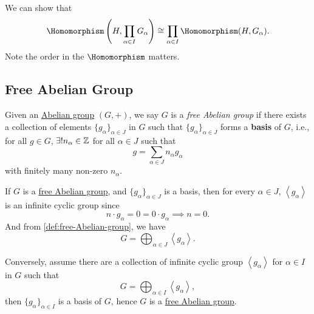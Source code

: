\begin{exercise}
	We can show that
	\[
		\Homomorphism \left(H, \prod\limits_{\alpha \in I}G_\alpha\right) \cong \prod\limits_{\alpha \in I}\Homomorphism (H, G_\alpha).
	\]
	Note the order in the \(\Homomorphism \) matters.
\end{exercise}

\subsection{Free Abelian Group}
\begin{definition}\label{def:free-Abelian-group}
	Given an  \hyperref[def:Abelian-group]{Abelian group} \((G, +)\), we say \(G\) is a \emph{free Abelian group} if there exists a collection of elements \(\{g_\alpha \}_{\alpha \in J}\) in \(G\) such that
	\(\{g_\alpha \}_{\alpha \in J}\) forms a \textbf{basis} of \(G\), i.e., for all \(g\in G\), \(\exists ! n _\alpha \in \mathbb{\MakeUppercase{z}} \) for all \(\alpha \in J\) such that
	\[
		g = \sum\limits_{\alpha \in J} n_\alpha g_\alpha
	\]
	with finitely many non-zero \(n_\alpha\).
\end{definition}
\begin{remark}
	If \(G\) is a \hyperref[def:free-Abelian-group]{free Abelian group}, and \(\{g_\alpha \}_{\alpha \in J}\) is a basis, then for every \(\alpha \in J\), \(\left< g_\alpha \right> \) is an
	infinite cyclic group since
	\[
		n\cdot g_\alpha = 0 = 0\cdot g_\alpha \implies n = 0.
	\]
	And from \autoref{def:free-Abelian-group}, we have
	\[
		G = \bigoplus_{\alpha \in J}\left< g_\alpha  \right>.
	\]

	Conversely, assume there are a collection of infinite cyclic group \(\left< g_\alpha  \right> \) for \(\alpha \in I\) in \(G\) such that
	\[
		G = \bigoplus_{\alpha \in I}\left< g_\alpha  \right>,
	\]
	then \(\{g_\alpha \}_{\alpha \in I}\) is a basis of \(G\), hence \(G\) is a \hyperref[def:free-Abelian-group]{free Abelian group}.
\end{remark}


